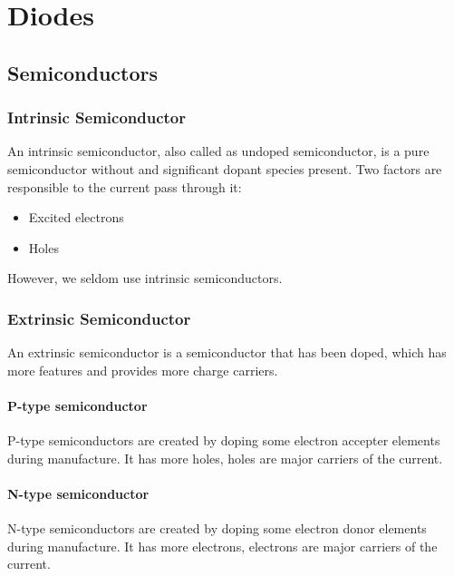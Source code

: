

\chapter{Diodes}

\section{Semiconductors}

\subsection{Intrinsic Semiconductor}

An intrinsic semiconductor, also called as undoped semiconductor, is a pure semiconductor without and significant dopant species present. Two factors are responsible to the current pass through it:

\begin{itemize}
\item Excited electrons
\item Holes
\end{itemize}

However, we seldom use intrinsic semiconductors.

\subsection{Extrinsic Semiconductor}

An extrinsic semiconductor is a semiconductor that has been doped, which has more features and provides more charge carriers.

\subsubsection{P-type semiconductor}

P-type semiconductors are created by doping some electron accepter elements during manufacture. It has more holes, holes are major carriers of the current.

\subsubsection{N-type semiconductor}

N-type semiconductors are created by doping some electron donor elements during manufacture. It has more electrons, electrons are major carriers of the current.

